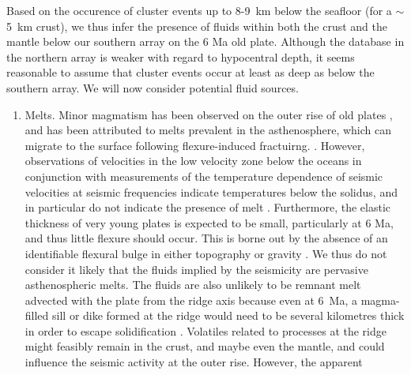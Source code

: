 \documentclass[reviewcopy]{elsart}
\begin{document}
Based on the occurence of cluster events up to 8-9~km below the
seafloor (for a $\sim$5~km crust), we thus infer
the presence of fluids within both the crust and the  mantle below our southern
array on the 6 Ma old plate. 
Although the database in the northern array is
weaker with regard to hypocentral depth, it seems reasonable to assume that cluster events
occur at least as deep as below the southern array. We will now
consider potential fluid sources. 
\begin{enumerate}
\item Melts. Minor magmatism has been observed on the outer rise of
  old plates \citep{hirano04}, and has been attributed to
  melts prevalent in the asthenosphere, which can migrate to the
  surface following flexure-induced fractuirng. 
  \citep{hirano06}.   However, observations of velocities in
  the low velocity zone below the oceans  in conjunction with
  measurements of the temperature dependence of seismic velocities at
  seismic frequencies indicate temperatures below the solidus, and in
  particular do not indicate the presence of melt \citep{priestley05,faul05}. 
   Furthermore, the elastic thickness of very young plates
   is expected to be small, particularly at 6 Ma, and thus little flexure should
  occur.   This   is borne out by the absence of an identifiable flexural bulge in either topography or
  gravity \citep[e.g.][]{bry03}.   We thus do not consider it likely that
  the fluids implied by the seismicity are pervasive asthenospheric
  melts.  The fluids are also unlikely to be remnant melt advected
  with the plate from the ridge axis because
  even at 6~Ma, a magma-filled sill or dike formed
  at the ridge would need to be several kilometres thick in order to
  escape solidification \citep{turcotte02}. 
%
 Volatiles related to processes at the ridge might feasibly
  remain in the crust, and maybe even the mantle, and could influence
  the  seismic activity at the outer rise.  However, the apparent

\end{enumerate}
\end{document}
